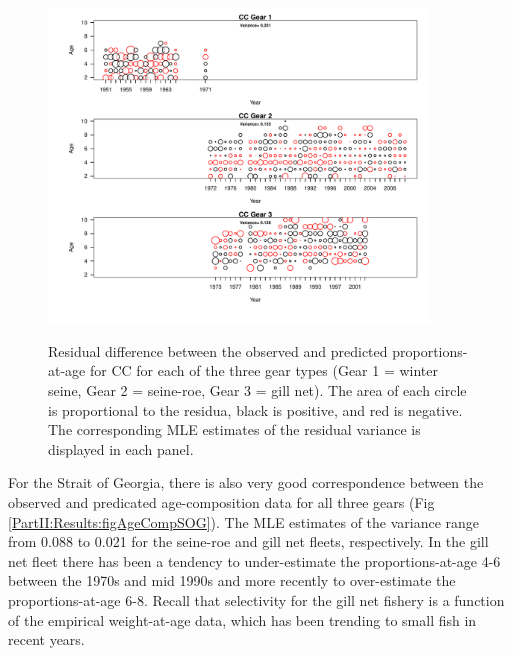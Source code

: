 \begin{figure}
	\centering
	\includegraphics[width=0.9\textwidth]{../FIGS/qPriorFigs/iscam_fig_agecompsresid_CC.pdf}\\
	\caption{Residual difference between the observed and predicted proportions-at-age for CC for each of the three gear types (Gear 1 = winter seine, Gear 2 = seine-roe, Gear 3 = gill net).  The area of each circle is proportional to the residua, black is positive, and red is negative.  The corresponding MLE estimates of the residual variance is displayed in each panel.}\label{PartII:Results:figAgeCompCC}
\end{figure}

For the Strait of Georgia, there is also very good correspondence between the observed and predicated age-composition data for all three gears (Fig \ref{PartII:Results:figAgeCompSOG}).  The MLE estimates of the variance range from 0.088 to 0.021 for the seine-roe and gill net fleets, respectively.  In the gill net fleet  there has been a tendency to under-estimate the proportions-at-age 4-6 between the 1970s and mid 1990s and more recently to over-estimate the proportions-at-age 6-8.  Recall that selectivity for the gill net fishery is a function of the empirical weight-at-age data, which has been trending to small fish in recent years.


